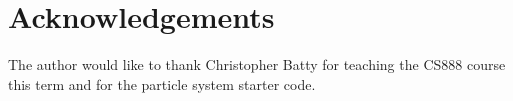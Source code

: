 \documentclass[tog]{acmsiggraph}
\begin{document}
\section*{Acknowledgements}

The author would like to thank Christopher Batty for teaching the CS888 course this term and for the particle system starter code.




\end{document}
